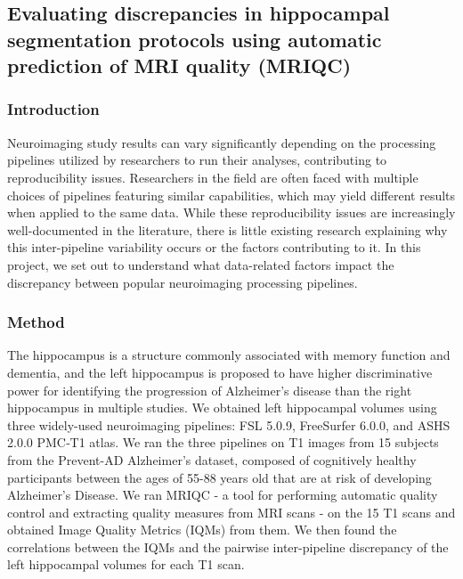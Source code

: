 \documentclass[../main.tex]{subfiles}
\begin{document}
\subsection{Evaluating discrepancies in hippocampal segmentation protocols using automatic prediction of MRI quality (MRIQC)}


\subsubsection{Introduction}

Neuroimaging study results can vary significantly depending on the processing pipelines utilized by researchers to run their analyses, contributing to reproducibility issues. Researchers in the field are often faced with multiple choices of pipelines featuring similar capabilities, which may yield different results when applied to the same data\citep{carp2012plurality, kennedy2019everything}. While these reproducibility issues are increasingly well-documented in the literature, there is little existing research explaining why this inter-pipeline variability occurs or the factors contributing to it. In this project, we set out to understand what data-related factors impact the discrepancy between popular neuroimaging processing pipelines.

\subsubsection{Method}

The hippocampus is a structure commonly associated with memory function and dementia, and the left hippocampus is proposed to have higher discriminative power for identifying the progression of Alzheimer’s disease than the right hippocampus in multiple studies\citep{schuff2009mri}. We obtained left hippocampal volumes using three widely-used neuroimaging pipelines: FSL 5.0.9\citep{patenaude2011bayesian}, FreeSurfer 6.0.0\citep{fischl2012freesurfer}, and ASHS 2.0.0 PMC‐T1 atlas\citep{xie2019automated}.
We ran the three pipelines on T1 images from 15 subjects from the Prevent-AD Alzheimer’s dataset\citep{tremblay2021open}, composed of cognitively healthy participants between the ages of 55-88 years old that are at risk of developing Alzheimer's Disease. 
We ran MRIQC\citep{esteban2017mriqc} - a tool for performing automatic quality control and extracting quality measures from MRI scans - on the 15 T1 scans and obtained Image Quality Metrics (IQMs) from them. We then found the correlations between the IQMs and the pairwise inter-pipeline discrepancy of the left hippocampal volumes for each T1 scan.
\end{document}
